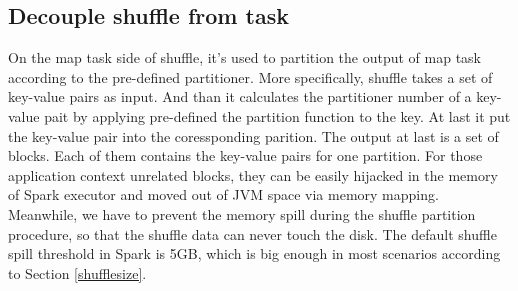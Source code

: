 \documentclass[10pt,twocolumn]{article}
\begin{document}
\subsection{Decouple shuffle from task}
On the map task side of shuffle, it's used to partition the output of map task according to the pre-defined partitioner. More specifically, shuffle takes a set of key-value pairs as input. And than it calculates the partitioner number of a key-value pait by applying pre-defined the partition function to the key. At last it put the key-value pair into the coressponding parition. The output at last is a set of blocks. Each of them contains the key-value pairs for one partition. For those application context unrelated blocks, they can be easily hijacked in the memory of Spark executor and moved out of JVM space via memory mapping. Meanwhile, we have to prevent the memory spill during the shuffle partition procedure, so that the shuffle data can never touch the disk. The default shuffle spill threshold in Spark is 5GB\cite{sparksource}, which is big enough in most scenarios according to Section \ref{shufflesize}.
\end{document}
